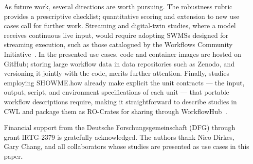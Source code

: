 \documentclass{eceasst}
\begin{document}
As future work, several directions are worth pursuing. The robustness rubric
provides a prescriptive checklist; quantitative scoring and extension to new
use cases call for further work. Streaming and digital-twin studies,
where a model receives continuous live input, would require adopting SWMSs designed for streaming execution, such as those catalogued by the
Workflows Community Initiative~\cite{suter2025terminology}. In the presented use cases, code and container images are hosted on GitHub; storing large workflow data in data repositories such as Zenodo, and versioning it jointly with the code, merits further attention. Finally, studies employing SHOWME.how already make explicit the unit contracts ---
the input, output, script, and environment specifications of each unit --- that
portable workflow descriptions require, making it straightforward to
describe studies in CWL and package them as RO-Crates for sharing through
WorkflowHub~\cite{soilandreyes2022rocrate,gustafsson2025workflowhub}.

\FloatBarrier

\begin{acknowledge}
  Financial support from the Deutsche Forschungsgemeinschaft (DFG) through grant
  IRTG-2379 is gratefully acknowledged. The authors thank Nico Dirkes, Gary Chang, and all
  collaborators whose studies are presented as use cases in this paper.
\end{acknowledge}



\end{document}
